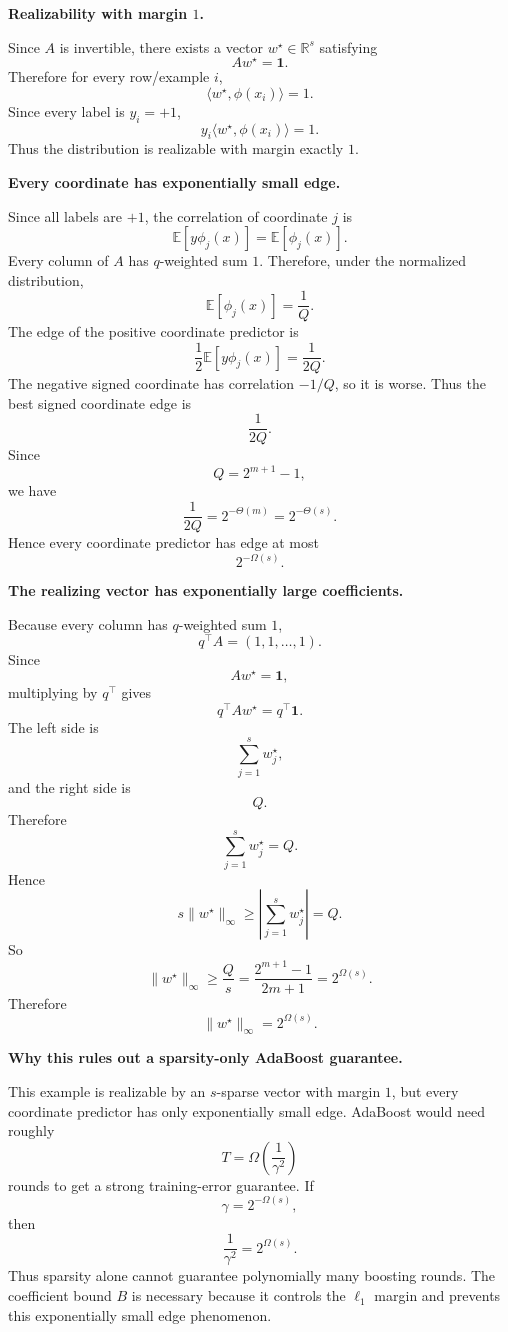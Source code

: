 \documentclass[11pt]{article}
\newcommand{\E}{\mathbb{E}}
\begin{document}
\begin{enumerate}
\begin{solutionbox}
    \medskip

    \textbf{Realizability with margin $1$.}

    Since $A$ is invertible, there exists a vector $w^\star\in\mathbb R^s$ satisfying
    \[
    Aw^\star=\mathbf 1.
    \]
    Therefore for every row/example $i$,
    \[
    \langle w^\star,\phi(x_i)\rangle=1.
    \]
    Since every label is $y_i=+1$,
    \[
    y_i\langle w^\star,\phi(x_i)\rangle=1.
    \]
    Thus the distribution is realizable with margin exactly $1$.

    \medskip

    \textbf{Every coordinate has exponentially small edge.}

    Since all labels are $+1$, the correlation of coordinate $j$ is
    \[
    \E[y\phi_j(x)]=\E[\phi_j(x)].
    \]
    Every column of $A$ has $q$-weighted sum $1$. Therefore, under the normalized distribution,
    \[
    \E[\phi_j(x)]=\frac{1}{Q}.
    \]
    The edge of the positive coordinate predictor is
    \[
    \frac12\E[y\phi_j(x)]
    =
    \frac{1}{2Q}.
    \]
    The negative signed coordinate has correlation $-1/Q$, so it is worse. Thus the best signed
    coordinate edge is
    \[
    \frac{1}{2Q}.
    \]
    Since
    \[
    Q=2^{m+1}-1,
    \]
    we have
    \[
    \frac{1}{2Q}=2^{-\Theta(m)}=2^{-\Theta(s)}.
    \]
    Hence every coordinate predictor has edge at most
    \[
    \boxed{2^{-\Omega(s)}.}
    \]

    \medskip

    \textbf{The realizing vector has exponentially large coefficients.}

    Because every column has $q$-weighted sum $1$,
    \[
    q^\top A=(1,1,\ldots,1).
    \]
    Since
    \[
    Aw^\star=\mathbf 1,
    \]
    multiplying by $q^\top$ gives
    \[
    q^\top A w^\star=q^\top\mathbf 1.
    \]
    The left side is
    \[
    \sum_{j=1}^s w_j^\star,
    \]
    and the right side is
    \[
    Q.
    \]
    Therefore
    \[
    \sum_{j=1}^s w_j^\star=Q.
    \]
    Hence
    \[
    s\|w^\star\|_\infty
    \ge
    \left|\sum_{j=1}^s w_j^\star\right|
    =
    Q.
    \]
    So
    \[
    \|w^\star\|_\infty
    \ge
    \frac{Q}{s}
    =
    \frac{2^{m+1}-1}{2m+1}
    =
    2^{\Omega(s)}.
    \]
    Therefore
    \[
    \boxed{\|w^\star\|_\infty=2^{\Omega(s)}.}
    \]

    \medskip

    \textbf{Why this rules out a sparsity-only AdaBoost guarantee.}

    This example is realizable by an $s$-sparse vector with margin $1$, but every coordinate
    predictor has only exponentially small edge. AdaBoost would need roughly
    \[
    T=\Omega\left(\frac{1}{\gamma^2}\right)
    \]
    rounds to get a strong training-error guarantee. If
    \[
    \gamma=2^{-\Omega(s)},
    \]
    then
    \[
    \frac{1}{\gamma^2}=2^{\Omega(s)}.
    \]
    Thus sparsity alone cannot guarantee polynomially many boosting rounds. The coefficient
    bound $B$ is necessary because it controls the $\ell_1$ margin and prevents this
    exponentially small edge phenomenon.
    \end{solutionbox}


\end{enumerate}
\end{document}
